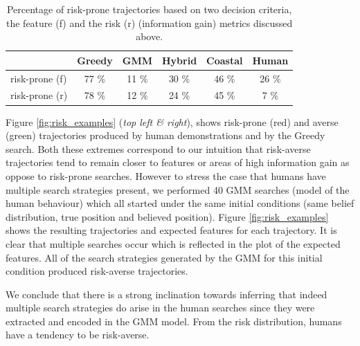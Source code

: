 \begin{table}
 \begin{tabular}{l|c|c|c|c|c|}
                 &  Greedy & GMM   & Hybrid & Coastal & Human \\ \hline
  risk-prone (f) &   77 \% & 11 \% &  30 \% & 46 \% & 26  \% \\ \hline
  risk-prone (r) &   78 \% & 12 \% &  24 \% & 45 \% &  7 \% \\ \hline
 \end{tabular}
 \caption{Percentage of risk-prone trajectories based on two decision criteria, the feature (f) and the risk (r) (information gain) metrics discussed above.}
 \label{tab:percentage-risk-prone}
\end{table}



Figure \ref{fig:risk_examples} (\textit{top left \& right}), shows risk-prone (red) and 
averse (green) trajectories produced by human demonstrations and by the Greedy search. Both these extremes
correspond to our intuition that risk-averse trajectories tend to remain closer to features or areas of high information gain
as oppose to risk-prone searches. However to stress the case that humans have multiple search strategies 
present, we performed 40 GMM searches (model of the human behaviour) which all started under the same initial conditions
(same belief distribution, true position and believed position). Figure \ref{fig:risk_examples}
shows the resulting trajectories and expected features for each trajectory. 
It is clear that multiple searches occur which is reflected in the plot of the expected features. All of the 
search strategies generated by the GMM for this initial condition produced risk-averse trajectories.


We conclude that there is a strong inclination towards inferring that indeed multiple search strategies do 
arise in the human searches since they were extracted and encoded in the GMM model. From the risk distribution, humans have a 
tendency to be risk-averse.

